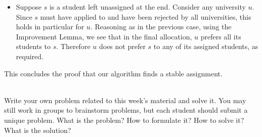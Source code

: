 \documentclass[11pt]{article}
\begin{document}
\begin{qunlist}
\begin{itemize}
\begin{itemize}
\item Suppose $s$ is a student left unassigned at the end. Consider any university $u$.
Since $s$ must have applied to and have been rejected by all universities, this holds in particular for $u$.
Reasoning as in the previous case, using the Improvement Lemma, we see that in the final allocation,
$u$ prefers all its students to $s$. 
Therefore $u$ does not prefer $s$ to any of its assigned students, as required.
\end{itemize}
This concludes the proof that our algorithm finds a stable assignment. 
\fi

\end{itemize}




 \\
Write your own problem related to this week's material and solve it. 
You may still work in groups to brainstorm problems, but each student should submit a unique problem. 
What is the problem? How to formulate it? How to solve it? What is the solution?


\end{qunlist}
\end{document}
